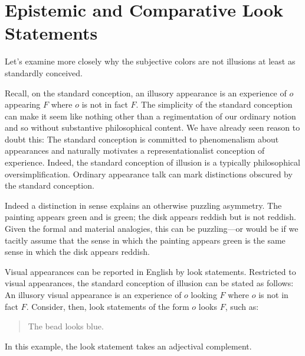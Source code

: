 \documentclass[12pt]{article}
\begin{document}


\section{Epistemic and Comparative Look Statements}\label{sec:epistemic_and_comparative_look_statements} %

Let's examine more closely why the subjective colors are not illusions at least as standardly conceived. 

Recall, on the standard conception, an illusory appearance is an experience of \( o \) appearing \( F \) where \( o \) is not in fact \( F \). The simplicity of the standard conception can make it seem like nothing other than a regimentation of our ordinary notion and so without substantive philosophical content. We have already seen reason to doubt this: The standard conception is committed to phenomenalism about appearances and naturally motivates a representationalist conception of experience. Indeed, the standard conception of illusion is a typically philosophical oversimplification. Ordinary appearance talk can mark distinctions obscured by the standard conception. 

Indeed a distinction in sense explains an otherwise puzzling asymmetry. The painting appears green and is green; the disk appears reddish but is not reddish. Given the formal and material analogies, this can be puzzling---or would be if we tacitly assume that the sense in which the painting appears green is the same sense in which the disk appears reddish.

Visual appearances can be reported in English by look statements. Restricted to visual appearances, the standard conception of illusion can be stated as follows: An illusory visual appearance is an experience of \( o \) looking \( F \) where \( o \) is not in fact \( F \). Consider, then, look statements of the form \( o \) looks \( F \), such as:
	\begin{quote}
		The bead looks blue.
	\end{quote}
In this example, the look statement takes an adjectival complement. 
\end{document}
